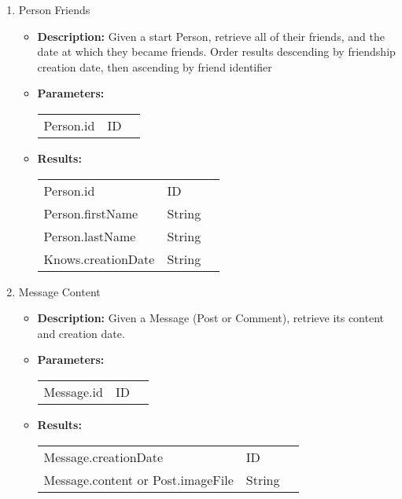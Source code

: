 \begin{enumerate}
  \item Person Friends
    \begin{itemize}
      \item \textbf{Description:}
        Given a start Person, retrieve all of their friends, and the date at which they became friends.
        Order results descending by friendship creation date, then ascending by friend identifier
      \item \textbf{Parameters:} \\
        \begin{tabular}{lll}
          Person.id 										& ID \\
        \end{tabular}
      \item \textbf{Results:} \\
        \begin{tabular}{lll}
          Person.id     									& ID \\
          Person.firstName     						& String \\
          Person.lastName    							& String \\
          Knows.creationDate    					& String \\
        \end{tabular}
    \end{itemize}

  \item Message Content 
    \begin{itemize}
      \item \textbf{Description:}
        Given a Message (Post or Comment), retrieve its content and creation date.
      \item \textbf{Parameters:} \\
        \begin{tabular}{lll}
          Message.id 										& ID \\
        \end{tabular}
      \item \textbf{Results:} \\
        \begin{tabular}{lll}
          Message.creationDate   									& ID \\
          Message.content or Post.imageFile           										& String \\
        \end{tabular}
    \end{itemize}


\end{enumerate}
